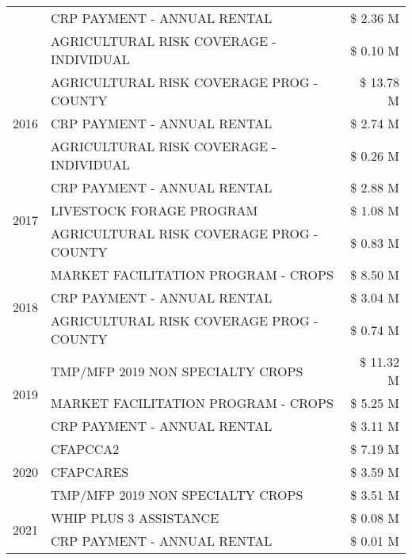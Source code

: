 \begin{tabular}{llr}
 & CRP PAYMENT - ANNUAL RENTAL & \$ 2.36 M \\
 & AGRICULTURAL RISK COVERAGE - INDIVIDUAL & \$ 0.10 M \\
\cline{1-3}
\multirow[t]{3}{*}{2016} & AGRICULTURAL RISK COVERAGE PROG - COUNTY & \$ 13.78 M \\
 & CRP PAYMENT - ANNUAL RENTAL & \$ 2.74 M \\
 & AGRICULTURAL RISK COVERAGE - INDIVIDUAL & \$ 0.26 M \\
\cline{1-3}
\multirow[t]{3}{*}{2017} & CRP PAYMENT - ANNUAL RENTAL & \$ 2.88 M \\
 & LIVESTOCK FORAGE PROGRAM & \$ 1.08 M \\
 & AGRICULTURAL RISK COVERAGE PROG - COUNTY & \$ 0.83 M \\
\cline{1-3}
\multirow[t]{3}{*}{2018} & MARKET FACILITATION PROGRAM - CROPS & \$ 8.50 M \\
 & CRP PAYMENT - ANNUAL RENTAL & \$ 3.04 M \\
 & AGRICULTURAL RISK COVERAGE PROG - COUNTY & \$ 0.74 M \\
\cline{1-3}
\multirow[t]{3}{*}{2019} & TMP/MFP 2019 NON SPECIALTY CROPS & \$ 11.32 M \\
 & MARKET FACILITATION PROGRAM - CROPS & \$ 5.25 M \\
 & CRP PAYMENT - ANNUAL RENTAL & \$ 3.11 M \\
\cline{1-3}
\multirow[t]{3}{*}{2020} & CFAPCCA2 & \$ 7.19 M \\
 & CFAPCARES & \$ 3.59 M \\
 & TMP/MFP 2019 NON SPECIALTY CROPS & \$ 3.51 M \\
\cline{1-3}
\multirow[t]{2}{*}{2021} & WHIP PLUS 3 ASSISTANCE & \$ 0.08 M \\
 & CRP PAYMENT - ANNUAL RENTAL & \$ 0.01 M \\
\cline{1-3}
\bottomrule
\end{tabular}

